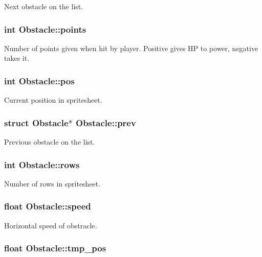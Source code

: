 \-Next obstacle on the list. \hypertarget{structObstacle_a38a164a0e4d6f6508fb65c6eff39147f}{
\subsubsection[{points}]{\setlength{\rightskip}{0pt plus 5cm}int {\bf \-Obstacle\-::points}}}\label{structObstacle_a38a164a0e4d6f6508fb65c6eff39147f}
\-Number of points given when hit by player. \-Positive gives \-H\-P to power, negative takes it. \hypertarget{structObstacle_a5228dff4dc773a66043e822fb4d6d00c}{
\subsubsection[{pos}]{\setlength{\rightskip}{0pt plus 5cm}int {\bf \-Obstacle\-::pos}}}\label{structObstacle_a5228dff4dc773a66043e822fb4d6d00c}
\-Current position in spritesheet. \hypertarget{structObstacle_a13bc07b730f58d5b1c3db68e8e4aca27}{
\subsubsection[{prev}]{\setlength{\rightskip}{0pt plus 5cm}struct {\bf \-Obstacle}$\ast$ {\bf \-Obstacle\-::prev}}}\label{structObstacle_a13bc07b730f58d5b1c3db68e8e4aca27}
\-Previous obstacle on the list. \hypertarget{structObstacle_aab33c9d4c0f05d02fda4e77cff7d7e72}{
\subsubsection[{rows}]{\setlength{\rightskip}{0pt plus 5cm}int {\bf \-Obstacle\-::rows}}}\label{structObstacle_aab33c9d4c0f05d02fda4e77cff7d7e72}
\-Number of rows in spritesheet. \hypertarget{structObstacle_a1e2b46db05325273ce0fcba3550b5b2a}{
\subsubsection[{speed}]{\setlength{\rightskip}{0pt plus 5cm}float {\bf \-Obstacle\-::speed}}}\label{structObstacle_a1e2b46db05325273ce0fcba3550b5b2a}
\-Horizontal speed of obstracle. \hypertarget{structObstacle_afd620c4c3496cd6f84184dcda4ca7611}{
\subsubsection[{tmp\-\_\-pos}]{\setlength{\rightskip}{0pt plus 5cm}float {\bf \-Obstacle\-::tmp\-\_\-pos}}}\label{structObstacle_afd620c4c3496cd6f84184dcda4ca7611}
